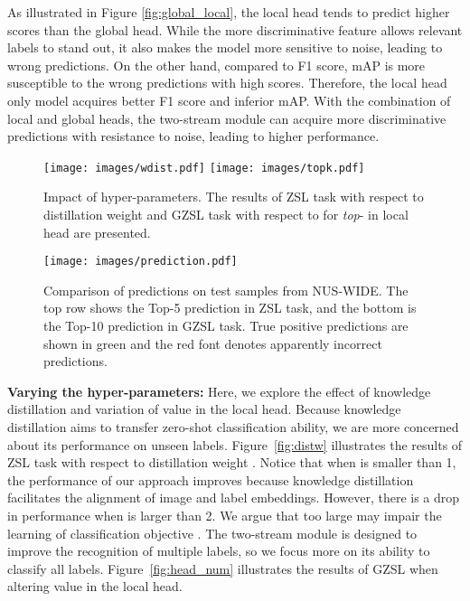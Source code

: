 \documentclass[letterpaper]{article} \usepackage{aaai23}  \usepackage{times}  \usepackage{helvet}  \usepackage{courier}  \usepackage[hyphens]{url}  \usepackage{graphicx} \urlstyle{rm} \def\UrlFont{\rm}  \usepackage{natbib}  \usepackage{caption} \frenchspacing  \setlength{\pdfpagewidth}{8.5in}  \setlength{\pdfpageheight}{11in}
\begin{document}
As illustrated in Figure \ref{fig:global_local}, the local head tends to predict higher scores than the global head.
While the more discriminative feature allows relevant labels to stand out, it also makes the model more sensitive to noise, leading to wrong predictions.
On the other hand, compared to F1 score, mAP is more susceptible to the wrong predictions with high scores. 
Therefore, the local head only model acquires better F1 score and inferior mAP.
With the combination of local and global heads, the two-stream module can acquire more discriminative predictions with resistance to noise, leading to higher performance.
\begin{figure}[t]
\centering
{}
    {\texttt{[image: images/wdist.pdf]}}
    {\texttt{[image: images/topk.pdf]}}
\caption{Impact of hyper-parameters. 
The results of ZSL task with respect to distillation weight  and GZSL task with respect to  for \textit{top}- in local head are presented.
}
\label{fig:hyper}
\end{figure} \begin{figure}[ht]
\centering
\texttt{[image: images/prediction.pdf]}
\caption{
Comparison of predictions on test samples from NUS-WIDE. 
The top row shows the Top-5 prediction in ZSL task, and the bottom is the Top-10 prediction in GZSL task. 
True positive predictions are shown in green and the red font denotes apparently incorrect predictions. }
\label{fig:prediction}
\end{figure} \noindent\textbf{Varying the hyper-parameters:}
Here, we explore the effect of knowledge distillation and variation of  value in the local head.
Because knowledge distillation aims to transfer zero-shot classification ability, we are more concerned about its performance on unseen labels.
Figure~\ref{fig:distw} illustrates the results of ZSL task with respect to distillation weight . 
Notice that when  is smaller than 1, the performance of our approach improves because knowledge distillation facilitates the alignment of image and label embeddings. 
However, there is a drop in performance when  is larger than 2. 
We argue that too large  may impair the learning of classification objective .
The two-stream module is designed to improve the recognition of multiple labels, so we focus more on its ability to classify all labels.
Figure~\ref{fig:head_num} illustrates the results of GZSL when altering  value in the local head.
\end{document}
